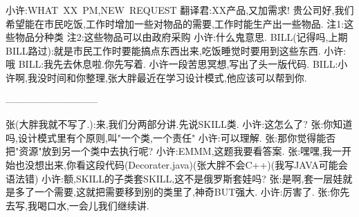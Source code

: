 \enter
小许:WHAT~XX~PM,NEW~REQUEST\enter
翻译君:XX产品,又加需求!\enter
贵公司好,我们希望能在市民吃饭,工作时增加一些对物品的需要,工作时能生产出一些物品.\enter
注1:这些物品分种类\enter
注2:这些物品可以由政府采购\enter
\enter
小许:什么鬼意思.\enter
BILL(记得吗,上期BILL路过):就是市民工作时要能搞点东西出来,吃饭睡觉时要用到这些东西.\enter
小许:哦\enter
BILL:我先去休息啦.你先写着.\enter
小许一段苦思冥想,写出了头一版代码.\enter
BILL:小许啊,我没时间和你整理,张大胖最近在学习设计模式,他应该可以帮到你.\enter
\centerline{-----------------------------}\enter
张(大胖我就不写了.):来,我们分两部分讲.先说SKILL类.\enter
小许:这怎么了?\enter
张:你知道吗,设计模式里有个原则,叫"一个类,一个责任"\enter
小许:可以理解.\enter
张:那你觉得能否把"资源"放到另一个类中去执行呢?\enter
小许:EMMM,这题我要看答案.\enter
张:嘿嘿,我一开始也没想出来,你看这段代码(Decorater.java)(张大胖不会C++)(我写JAVA可能会语法错)\enter
小许:额,SKILL的子类套SKILL,这不是俄罗斯套娃吗?\enter
张:是啊,套一层娃就是多了一个需要,这就把需要移到别的类里了,神奇BUT强大.\enter
小许:厉害了.\enter
张:你先去写,我喝口水,一会儿我们继续讲.\enter
